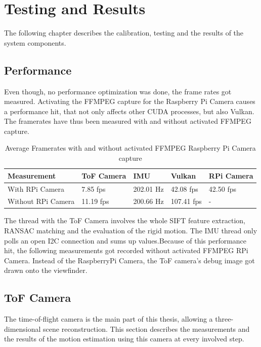 \chapter{Testing and Results}
\label{sec:Results}
The following chapter describes the calibration, testing and the results of the system components. 
\section{Performance}
\label{sec:performance}
Even though, no performance optimization was done, the frame rates got measured. Activating the FFMPEG capture for the Raspberry Pi Camera causes a performance hit, that not only affects other CUDA processes, but also Vulkan. The framerates have thus been measured with and without activated FFMPEG capture. 
\begin{table}[H] \centering
	\begin{tabular}{|p{3.3cm}|p{2.5cm}|p{2.5cm}|p{2.5cm}|p{2.5cm}|} \hline
		\rowcolor{gray} Measurement & ToF Camera & IMU & Vulkan & RPi Camera \\
		\hline
		With RPi Camera & 7.85 fps & 202.01 Hz & 42.08 fps & 42.50 fps\\
		\hline
		Without RPi Camera & 11.19 fps & 200.66 Hz & 107.41 fps & - \\
		\hline
	\end{tabular}
	\caption{Average Framerates with and without activated FFMPEG Raspberry Pi Camera capture}
	\label{tab:performance}
 \end{table}
 The thread with the ToF Camera involves the whole SIFT feature extraction, RANSAC matching and the evaluation of the rigid motion. The IMU thread only polls an open I2C connection and sums up values.Because of this performance hit, the following measurements got recorded without activated FFMPEG RPi Camera. Instead of the RaspberryPi Camera, the ToF camera's debug image got drawn onto the viewfinder.
\section{ToF Camera}
The time-of-flight camera is the main part of this thesis, allowing a three-dimensional scene reconstruction. This section describes the measurements and the results of the motion estimation using this camera at every involved step.
